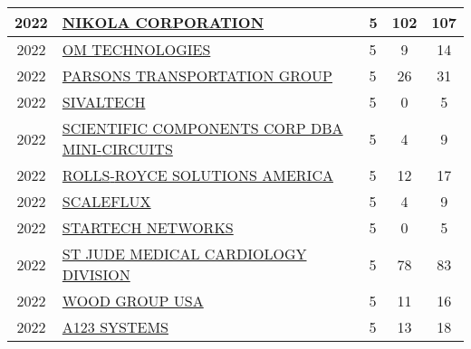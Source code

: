 \documentclass{article}%
\begin{document}
\begin{longtable}{c|p{20em}|p{5em}|c|c}
\hline%
2022&\hyperref[subsec:NIKOLACORPORATION]{NIKOLA CORPORATION}&5&102&107\\%
\hline%
2022&\hyperref[subsec:OMTECHNOLOGIES]{OM TECHNOLOGIES}&5&9&14\\%
\hline%
2022&\hyperref[subsec:PARSONSTRANSPORTATIONGROUP]{PARSONS TRANSPORTATION GROUP}&5&26&31\\%
\hline%
2022&\hyperref[subsec:SIVALTECH]{SIVALTECH}&5&0&5\\%
\hline%
2022&\hyperref[subsec:SCIENTIFICCOMPONENTSCORPDBAMINI{-}CIRCUITS]{SCIENTIFIC COMPONENTS CORP DBA MINI{-}CIRCUITS}&5&4&9\\%
\hline%
2022&\hyperref[subsec:ROLLS{-}ROYCESOLUTIONSAMERICA]{ROLLS{-}ROYCE SOLUTIONS AMERICA}&5&12&17\\%
\hline%
2022&\hyperref[subsec:SCALEFLUX]{SCALEFLUX}&5&4&9\\%
\hline%
2022&\hyperref[subsec:STARTECHNETWORKS]{STARTECH NETWORKS}&5&0&5\\%
\hline%
2022&\hyperref[subsec:STJUDEMEDICALCARDIOLOGYDIVISION]{ST JUDE MEDICAL CARDIOLOGY DIVISION}&5&78&83\\%
\hline%
2022&\hyperref[subsec:WOODGROUPUSA]{WOOD GROUP USA}&5&11&16\\%
\hline%
2022&\hyperref[subsec:A123SYSTEMS]{A123 SYSTEMS}&5&13&18\\%
\hline%
\end{longtable}

%
\newpage%
\end{document}
